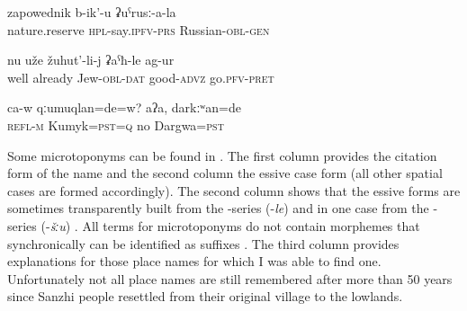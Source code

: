 		
		
\begin{exe}
	\ex	\label{ex:This is called nature reserve in Russian}
	\gll	zapowednik	b-ik'-u	ʡuˁrusː-a-la  \\
		nature.reserve	\textsc{hpl}-say.\textsc{ipfv-prs}	Russian-\textsc{obl-gen}\\
	\glt	{}

	\ex	\label{ex:Well, the Jew already felt better}
	\gll	nu	uže	žuhut'-li-j	ʡaˁħ-le	ag-ur   \\
		well	already	Jew-\textsc{obl-dat}	good-\textsc{advz}	go.\textsc{pfv-pret}\\
	\glt	{}

	\ex	\label{ex:Was he Kumyk No (he) was Dargwa}
	\gll	ca-w	qːumuqlan=de=w?	aʔa,	darkːʷan=de   \\
		\textsc{refl-m}	Kumyk=\textsc{pst=q} no Dargwa=\textsc{pst}\\
	\glt	{}
\end{exe}

Some microtoponyms can be found in . The first column provides the citation form of the name and the second column the essive case form (all other spatial cases are formed accordingly). The second column shows that the essive forms are sometimes transparently built from the -series (-\textit{le}) and in one case from the -series (-\textit{šːu}) . All terms for microtoponyms do not contain morphemes that synchronically can be identified as  suffixes . The third column provides explanations for those place names for which I was able to find one. Unfortunately not all place names are still remembered after more than 50 years since Sanzhi people resettled from their original village to the lowlands. 


